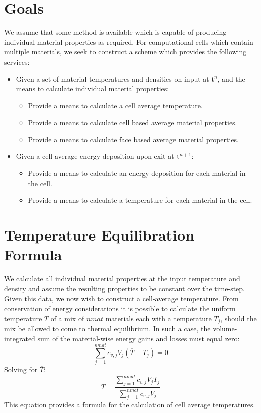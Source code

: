 \documentclass[12pt]{article}
\begin{document}
\section{Goals}


We assume that some method is available which is capable of producing
individual material properties as required. 
For computational cells which contain multiple materials,
we seek to construct a scheme which provides the following services:
\begin{itemize}
 \item Given a set of material temperatures and densities on input at t$^n$,
       and the means to calculate individual material properties:
 \begin{itemize}
   \item Provide a means to calculate a cell average temperature.
   \item Provide a means to calculate cell based average material properties.
   \item Provide a means to calculate face based average material
	 properties.
 \end{itemize}
\item Given a cell average energy deposition  upon exit at t$^{n+1}$:
\begin{itemize} 
  \item Provide a means to calculate an  energy deposition for each
        material in the cell.
  \item Provide a means to calculate a temperature for each material in 
        the cell.
\end{itemize}
\end{itemize}



\section{Temperature Equilibration Formula}

We calculate all individual material properties at the input
temperature and density and assume the resulting properties to be constant 
over the time-step.  Given this data, we now wish to construct
a cell-average temperature.
From conservation of energy considerations it is possible to calculate
the uniform temperature $\overline{T}$ of a mix of $nmat$ materials 
each with a temperature $T_j$, should
the mix be allowed to come to thermal equilibrium.
In such a case, the volume-integrated sum of the material-wise 
energy gains and losses must equal zero:
\begin{equation}
\sum_{j=1}^{nmat} c_{v,j} V_{j} (\overline{T}-T_{j}) = 0
\end{equation}
Solving for $\overline{T}$:
\begin{equation}
\overline{T} = \frac{\sum_{j=1}^{nmat}c_{v,j}V_{j}T_{j}}
	{\sum_{j=1}^{nmat}c_{v,j}V_{j}}
\label{eq:tbar}
\end{equation}
This equation provides a formula for the calculation of 
cell average temperatures.
\end{document}
